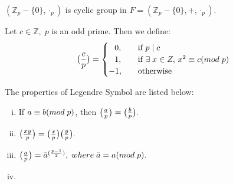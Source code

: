 \documentclass[10pt,a4paper]{article}
\begin{document}
\begin{corollary}
$(\mathbb{Z}_p-\{0\},\cdot_p)$ is cyclic group in $F=(\mathbb{Z}_p-\{0\},+,\cdot_p)$.
\end{corollary}

\begin{mydef}
Let $c\in\mathbb{Z},\;p$ is an odd prime. Then we define:
\[   
\big(\frac{c}{p}\big) = 
     \begin{cases}	
       \;\;\,0, &\quad\text{if }p\mid c\\
       \;\;\,1, &\quad\text{if }\exists\;x\in{Z},\,x^2\equiv c(mod\;p) \\
      -1, &\quad\text{otherwise}\\ 
     \end{cases}
\]
\end{mydef}


\begin{theorem}
The properties of Legendre Symbol are listed below:
\begin{enumerate}[i)]
\item If $a\equiv b(mod\;p)$, then $\big(\frac{a}{p}\big)=\big(\frac{b}{p}\big).$
\item $\big(\frac{xy}{p}\big)=\big(\frac{x}{p}\big)\big(\frac{y}{p}\big).$
\item $\big(\frac{a}{p}\big)={\bar{a}}^{(\frac{p-1}{2})},\;where\;\bar{a}=a(mod\;p).$
\item 
\end{enumerate}
\end{theorem}
\end{document}
